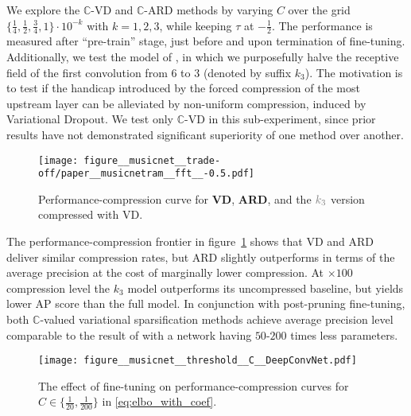 \documentclass{article}
\newcommand{\cplx}{\mathbb{C}}
\begin{document}
We explore the $\cplx$-VD and $\cplx$-ARD methods by varying $C$ over the grid $
  \{\tfrac14, \tfrac12, \tfrac34, 1\} \cdot 10^{-k}
$ with $k=1, 2, 3$, while keeping $\tau$ at $-\tfrac12$. The performance is measured after
``pre-train'' stage, just before and upon termination of fine-tuning.
%
Additionally, we test the model of \citet{trabelsi_deep_2018}, in which we purposefully
halve the receptive field of the first convolution from $6$ to $3$ (denoted by suffix $k_3$).
The motivation is to test if the handicap introduced by the forced compression of the most
upstream layer can be alleviated by non-uniform compression, induced by Variational Dropout.
We test only $\cplx$-VD in this sub-experiment, since prior results have not demonstrated
significant superiority of one method over another.  %

\begin{figure}[!t]
  \centering
  \texttt{[image: figure\_\_musicnet\_\_trade-off/paper\_\_musicnetram\_\_fft\_\_-0.5.pdf]}
  \caption{%
    Performance-compression curve for \textbf{\color{blue} VD}, \textbf{\color{orange} ARD},
    and the ${\color{gray} k_3}$ version compressed with VD.
  }
  \label{fig:musicnet__trade-off}
\end{figure}

The performance-compression frontier in figure~\ref{fig:musicnet__trade-off} shows that
VD and ARD deliver similar compression rates, but ARD slightly outperforms in terms of
the average precision at the cost of marginally lower compression.
%
At $\times100$ compression level the $k_3$ model outperforms its
uncompressed baseline, but yields lower AP score than the full model. In conjunction with
post-pruning fine-tuning, both $\cplx$-valued variational sparsification methods achieve
average precision level comparable to the result of \citet{trabelsi_deep_2018} with a
network having $50$-$200$ times less parameters.

\begin{figure}[!t]
  \centering
  \texttt{[image: figure\_\_musicnet\_\_threshold\_\_C\_\_DeepConvNet.pdf]}
  \caption{%
    The effect of fine-tuning on performance-compression curves for $
      C\in \{\tfrac1{20}, \frac1{200}\}
    $ in \eqref{eq:elbo_with_coef}.
  }
  \label{fig:hist__and__threshold__tradeoff}
\end{figure}
\end{document}
